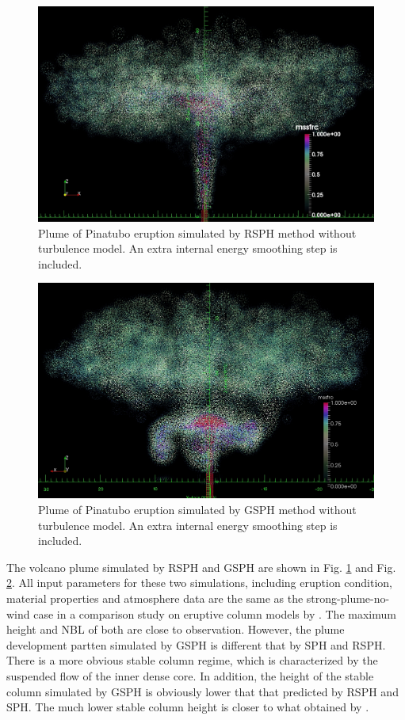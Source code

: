 \begin{figure}
\center
\includegraphics[width=0.75 \textwidth]{Chapter-6/Figures/RSPH_mssfrc_420s}
\caption{Plume of Pinatubo eruption simulated by RSPH method without turbulence model. An extra internal energy smoothing step is included.}
\label{fig:Pinatubo-RSPH}
\end{figure}

\begin{figure}
\center
\includegraphics[width=0.75 \textwidth]{Chapter-6/Figures/GSPH_mssfrc_640s}
\caption{Plume of Pinatubo eruption simulated by GSPH method without turbulence model. An extra internal energy smoothing step is included.}
\label{fig:Pinatubo-GSPH}
\end{figure}

The volcano plume simulated by RSPH and GSPH are shown in Fig. \ref{fig:Pinatubo-RSPH} and Fig. \ref{fig:Pinatubo-GSPH}. 
All input parameters for these two simulations, including eruption condition, material properties and atmosphere data are the same as the strong-plume-no-wind case in a comparison study on eruptive column models by \citet{costa2016results}.
The maximum height and NBL of both are close to observation. However, the plume development partten simulated by GSPH is different that by SPH and RSPH. There is a more obvious stable column regime, which is characterized by the suspended flow of the inner dense core. In addition, the height of the stable column simulated by GSPH is obviously lower that that predicted by RSPH and SPH. The much lower stable column height is closer to what obtained by \citet{suzuki2005numerical}.

